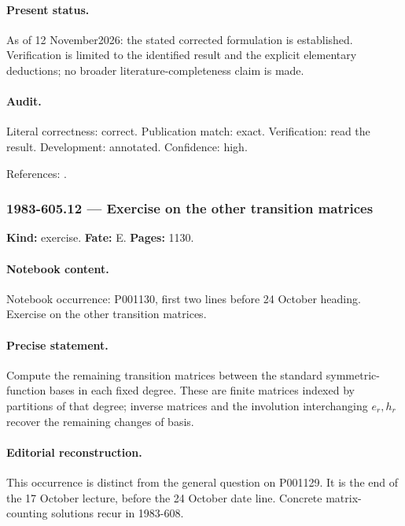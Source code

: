 \paragraph{Present status.} As of 12 November2026: the stated corrected formulation is established. Verification is limited to the identified result and the explicit elementary deductions; no broader literature-completeness claim is made.

\paragraph{Audit.} Literal correctness: correct. Publication match: exact. Verification: read the result. Development: annotated. Confidence: high.

\noindent References: \citep{macdonald1995symmetric}.\par

\subsubsection{1983-605.12 --- Exercise on the other transition matrices}

\label{item:1983-605.12}

\noindent\textbf{Kind:} exercise. \textbf{Fate:} E. \textbf{Pages:} 1130.\par

\paragraph{Notebook content.} Notebook occurrence: P001130, first two lines before 24 October heading. Exercise on the other transition matrices.

\paragraph{Precise statement.} Compute the remaining transition matrices between the standard symmetric-function bases in each fixed degree. These are finite matrices indexed by partitions of that degree; inverse matrices and the involution interchanging \(e_r,h_r\) recover the remaining changes of basis.

\paragraph{Editorial reconstruction.} This occurrence is distinct from the general question on P001129. It is the end of the 17 October lecture, before the 24 October date line. Concrete matrix-counting solutions recur in 1983-608.


